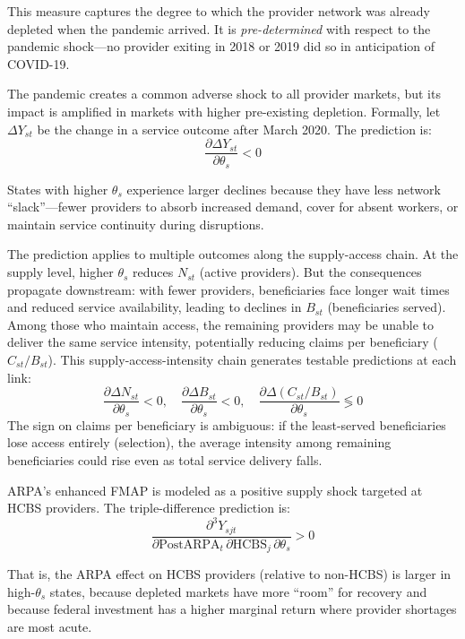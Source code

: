 \documentclass[12pt]{article}
\begin{document}
This measure captures the degree to which the provider network was already depleted when the pandemic arrived. It is \emph{pre-determined} with respect to the pandemic shock---no provider exiting in 2018 or 2019 did so in anticipation of COVID-19.

The pandemic creates a common adverse shock to all provider markets, but its impact is amplified in markets with higher pre-existing depletion. Formally, let $\Delta Y_{st}$ be the change in a service outcome after March 2020. The prediction is:
\begin{equation}
\frac{\partial \Delta Y_{st}}{\partial \theta_s} < 0
\end{equation}

States with higher $\theta_s$ experience larger declines because they have less network ``slack''---fewer providers to absorb increased demand, cover for absent workers, or maintain service continuity during disruptions.

The prediction applies to multiple outcomes along the supply-access chain. At the supply level, higher $\theta_s$ reduces $N_{st}$ (active providers). But the consequences propagate downstream: with fewer providers, beneficiaries face longer wait times and reduced service availability, leading to declines in $B_{st}$ (beneficiaries served). Among those who maintain access, the remaining providers may be unable to deliver the same service intensity, potentially reducing claims per beneficiary ($C_{st}/B_{st}$). This supply-access-intensity chain generates testable predictions at each link:
\begin{equation}
\frac{\partial \Delta N_{st}}{\partial \theta_s} < 0, \quad \frac{\partial \Delta B_{st}}{\partial \theta_s} < 0, \quad \frac{\partial \Delta (C_{st}/B_{st})}{\partial \theta_s} \lessgtr 0
\end{equation}
The sign on claims per beneficiary is ambiguous: if the least-served beneficiaries lose access entirely (selection), the average intensity among remaining beneficiaries could rise even as total service delivery falls.

ARPA's enhanced FMAP is modeled as a positive supply shock targeted at HCBS providers. The triple-difference prediction is:
\begin{equation}
\frac{\partial^3 Y_{sjt}}{\partial \text{PostARPA}_t \, \partial \text{HCBS}_j \, \partial \theta_s} > 0
\end{equation}

That is, the ARPA effect on HCBS providers (relative to non-HCBS) is larger in high-$\theta_s$ states, because depleted markets have more ``room'' for recovery and because federal investment has a higher marginal return where provider shortages are most acute.
\end{document}
